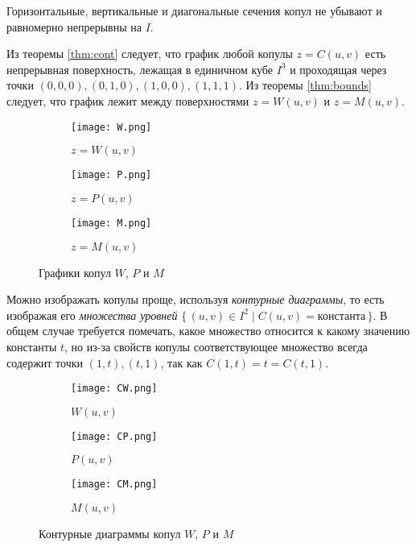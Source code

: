 \begin{theorem}\label{thm:sections}
	Горизонтальные, вертикальные и диагональные сечения копул не убывают и равномерно непрерывны на $I$.
\end{theorem}

Из теоремы \ref{thm:cont} следует, что график любой копулы $z = C(u, v)$ есть непрерывная поверхность, лежащая в единичном кубе $I^3$ и проходящая через точки $(0, 0, 0), (0, 1, 0), (1, 0, 0), (1, 1, 1)$. Из теоремы \ref{thm:bounds} следует, что график лежит между поверхностями $z = W(u, v)$ и $z = M(u, v)$.

\begin{figure}[H]
	\centering
	\begin{subfigure}{.5\textwidth}
		\centering
		\texttt{[image: W.png]}
		\caption{$z = W(u, v)$}
	\end{subfigure}%
	\begin{subfigure}{.5\textwidth}
		\centering
		\texttt{[image: P.png]}
		\caption{$z = P(u, v)$}
	\end{subfigure}
	\begin{subfigure}{.5\textwidth}
		\centering
		\texttt{[image: M.png]}
		\caption{$z = M(u, v)$}
	\end{subfigure}
	\caption{Графики копул $W$, $P$ и $M$}
\end{figure}

Можно изображать копулы проще, используя \emph{контурные диаграммы}, то есть изображая его \emph{множества уровней} $\{\, (u, v) \in I^2 \mid C(u, v) = \text{константа} \,\}$. В общем случае требуется помечать, какое множество относится к какому значению константы $t$, но из-за свойств копулы соответствующее множество всегда содержит точки $(1, t), (t, 1)$, так как $C(1, t) = t = C(t, 1)$.

\begin{figure}[H]
	\centering
	\begin{subfigure}{.3\textwidth}
		\centering
		\texttt{[image: CW.png]}
		\caption{$W(u, v)$}
	\end{subfigure}%
	\begin{subfigure}{.3\textwidth}
		\centering
		\texttt{[image: CP.png]}
		\caption{$P(u, v)$}
	\end{subfigure}
	\begin{subfigure}{.3\textwidth}
		\centering
		\texttt{[image: CM.png]}
		\caption{$M(u, v)$}
	\end{subfigure}
	\caption{Контурные диаграммы копул $W$, $P$ и $M$}
\end{figure}

